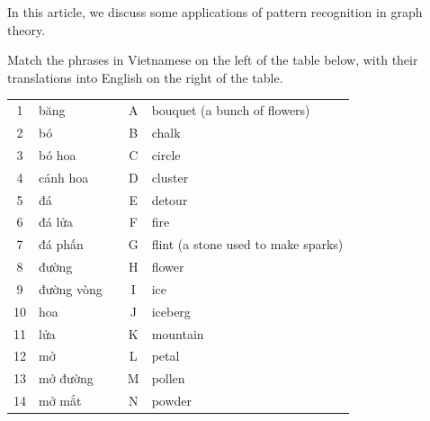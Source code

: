 \begin{multicols}{2}
	In this article, we discuss some applications of pattern recognition in graph theory.
	
	\begin{example*}[Match the phrases]
		
		Match the phrases in Vietnamese on the left of the table below,
		with their translations into English on the right of the table.
		
		\begin{otherlanguage}{vietnamese}
			
			\begin{center}
				\begin{tabular}{|c|l|c|c|l|}
					\cline{1-2} \cline{4-5}
					1  & băng       &  & A & bouquet (a bunch of flowers)        \\ \cline{1-2} \cline{4-5} 
					2  & bó         &  & B & chalk                               \\ \cline{1-2} \cline{4-5} 
					3  & bó hoa     &  & C & circle                              \\ \cline{1-2} \cline{4-5} 
					4  & cánh hoa   &  & D & cluster                             \\ \cline{1-2} \cline{4-5} 
					5  & đá         &  & E & detour                              \\ \cline{1-2} \cline{4-5} 
					6  & đá lửa     &  & F & fire                                \\ \cline{1-2} \cline{4-5} 
					7  & đá phấn    &  & G & flint (a stone used to make sparks) \\ \cline{1-2} \cline{4-5} 
					8  & đường      &  & H & flower                              \\ \cline{1-2} \cline{4-5} 
					9  & đường vòng &  & I & ice                                 \\ \cline{1-2} \cline{4-5} 
					10 & hoa        &  & J & iceberg                             \\ \cline{1-2} \cline{4-5} 
					11 & lửa        &  & K & mountain                            \\ \cline{1-2} \cline{4-5} 
					12 & mở         &  & L & petal                               \\ \cline{1-2} \cline{4-5} 
					13 & mở đường   &  & M & pollen                              \\ \cline{1-2} \cline{4-5} 
					14 & mở mắt     &  & N & powder                              \\ \cline{1-2} \cline{4-5} 

\end{tabular}
\end{center}
\end{otherlanguage}
\end{example*}
\end{multicols}
